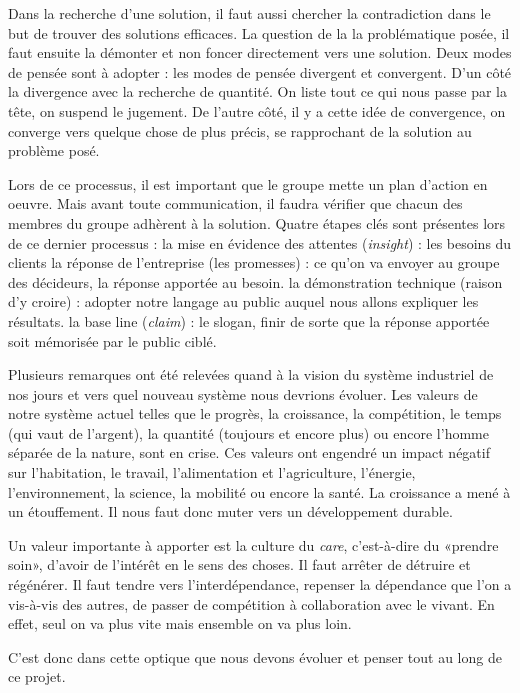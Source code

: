 Dans la recherche d'une solution, il faut aussi chercher la contradiction dans le but de trouver des solutions efficaces. La question de la la problématique posée, il faut ensuite la démonter et non foncer directement vers une solution.
Deux modes de pensée sont à adopter : les modes de pensée divergent et convergent. D'un côté la divergence avec la recherche de quantité. On liste tout ce qui nous passe par la tête, on suspend le jugement. De l'autre côté, il y a cette idée de convergence, on converge vers quelque chose de plus précis, se rapprochant de la solution au problème posé.

Lors de ce processus, il est important que le groupe mette un plan d'action en oeuvre. Mais avant toute communication, il faudra vérifier que chacun des membres du groupe adhèrent à la solution. Quatre étapes clés sont présentes lors de ce dernier processus :
la mise en évidence des attentes (\emph{insight}) : les besoins du clients
la réponse de l'entreprise (les promesses) : ce qu'on va envoyer au groupe des décideurs, la réponse apportée au besoin.
la démonstration technique (raison d'y croire) : adopter notre langage au public auquel nous allons expliquer les résultats.
la base line (\emph{claim}) : le slogan, finir de sorte que la réponse apportée soit mémorisée par le public ciblé.

Plusieurs remarques ont été relevées quand à la vision du système industriel de nos jours et vers quel nouveau système nous devrions évoluer.
Les valeurs de notre système actuel telles que le progrès, la croissance, la compétition, le temps (qui vaut de l'argent), la quantité (toujours et encore plus) ou encore l'homme séparée de la nature, sont en crise. Ces valeurs ont engendré un impact négatif sur l'habitation, le travail, l'alimentation et l'agriculture, l'énergie, l'environnement, la science, la mobilité ou encore la santé. La croissance a mené à un étouffement. Il nous faut donc muter vers un développement durable.

Un valeur importante à apporter est la culture du \emph{care}, c'est-à-dire du «prendre soin», d'avoir de l'intérêt en le sens des choses. Il faut arrêter de détruire et régénérer.
Il faut tendre vers l'interdépendance, repenser la dépendance que l'on a vis-à-vis des autres, de passer de compétition à collaboration avec le vivant. En effet, seul on va plus vite mais ensemble on va plus loin.

C'est donc dans cette optique que nous devons évoluer et penser tout au long de ce projet.
